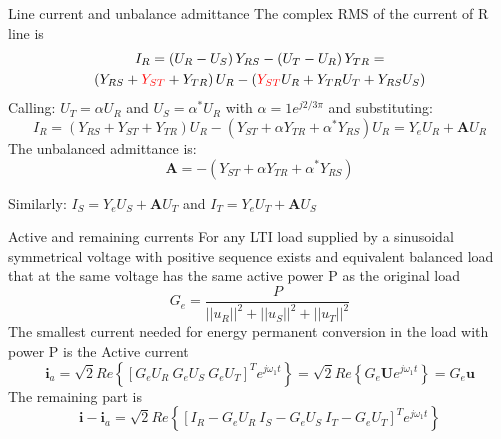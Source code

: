 \documentclass[aspectratio=169]{beamer}
\begin{document}
\begin{frame}{Line current and unbalance admittance}{\insertsection}
    The complex RMS of the current of R line is 
    \begin{gather}
        I_R = \left(U_R-U_S\right)Y_{RS} - \left(U_T-U_R\right)Y_{TR} = \notag \\
        \left(Y_{RS} + \textcolor{red}{Y_{ST}} + Y_{TR}\right) U_R - \left(\textcolor{red}{Y_{ST}}U_R + Y_{TR}U_T + Y_{RS}U_S\right)
    \end{gather}
    Calling: $U_T = \alpha U_R$ and $U_S = \alpha^* U_R$ with $\alpha=1e^{j2/3\pi}$ and substituting:
    \begin{equation}
        I_R = \left(Y_{RS} + Y_{ST} + Y_{TR}\right) U_R - \left(Y_{ST} + \alpha Y_{TR} + \alpha^* Y_{RS}\right)U_R = Y_e U_R + \textbf{A} U_R
        \label{eq:I_R}
    \end{equation}
     The \textcolor{NTNU_orange}{unbalanced admittance} is:
    \begin{equation}
      \textbf{A} =-(Y_{ST} + \alpha Y_{TR} + \alpha^*Y_{RS} )
    \end{equation}

    Similarly: $I_S = Y_e U_S + \textbf{A} U_T$  and  $I_T = Y_e U_T + \textbf{A} U_S$
\end{frame}

\begin{frame}{Active and remaining currents}{\insertsection}
    For any LTI load supplied by a sinusoidal symmetrical voltage with positive sequence exists and equivalent balanced load that at the same voltage has the same active power P as the original load
    \begin{equation}
        G_e = \frac{P}{||u_R||^2 + ||u_S||^2 + ||u_T||^2} 
    \end{equation}
    The smallest current needed for energy permanent conversion in the load with power P is the \textcolor{NTNU_orange}{Active current}
    \begin{equation}
        \textbf{i}_a = \sqrt{2} Re\left\{\left[G_e U_R \ G_e U_S \ G_e U_T\right]^Te^{j\omega_1t}\right\} = \sqrt{2} Re\left\{G_e \mathbf{U} e^{j\omega_1t} \right\} = G_e \textbf{u}
    \end{equation}
    The remaining part is 
    \begin{equation}
        \textbf{i} - \textbf{i}_a = \sqrt{2} Re\left\{\left[I_R - G_e U_R \ I_S -G_e U_S \ I_T - G_e U_T\right]^Te^{j\omega_1t}\right\}
        \label{eq:i_minus_ia}
    \end{equation}
    
\end{frame}
\end{document}
